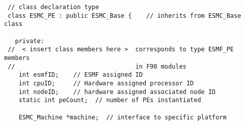 
\begin{verbatim}
 // class declaration type
 class ESMC_PE : public ESMC_Base {    // inherits from ESMC_Base class

   private:
 //  < insert class members here >  corresponds to type ESMF_PE members
 //                                 in F90 modules
    int esmfID;    // ESMF assigned ID
    int cpuID;     // Hardware assigned processor ID
    int nodeID;    // hardware assigned associated node ID
    static int peCount;  // number of PEs instantiated

    ESMC_Machine *machine;  // interface to specific platform
\end{verbatim}
